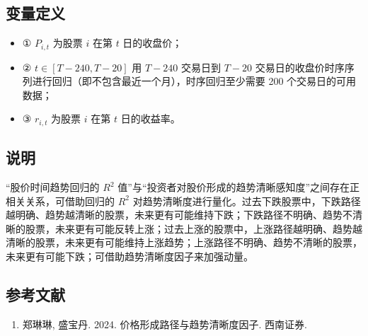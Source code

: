 \documentclass{article}
\begin{document}
\subsection{变量定义}
\begin{itemize}
    \item ① \( P_{i,t} \) 为股票 \( i \) 在第 \( t \) 日的收盘价；
    \item ② \( t \in [T-240, T-20] \) 用 \( T-240 \) 交易日到 \( T-20 \) 交易日的收盘价时序序列进行回归（即不包含最近一个月），时序回归至少需要 200 个交易日的可用数据；
    \item ③ \( r_{i,t} \) 为股票 \( i \) 在第 \( t \) 日的收益率。
\end{itemize}

\subsection{说明}
“股价时间趋势回归的 \( R^2 \) 值”与“投资者对股价形成的趋势清晰感知度”之间存在正相关关系，可借助回归的 \( R^2 \) 对趋势清晰度进行量化。过去下跌股票中，下跌路径越明确、趋势越清晰的股票，未来更有可能维持下跌；下跌路径不明确、趋势不清晰的股票，未来更有可能反转上涨；过去上涨的股票中，上涨路径越明确、趋势越清晰的股票，未来更有可能维持上涨趋势；上涨路径不明确、趋势不清晰的股票，未来更有可能下跌；可借助趋势清晰度因子来加强动量。

\subsection{参考文献}
\begin{enumerate}
    \item 郑琳琳, 盛宝丹. 2024. 价格形成路径与趋势清晰度因子. 西南证券.
\end{enumerate}
\end{document}
